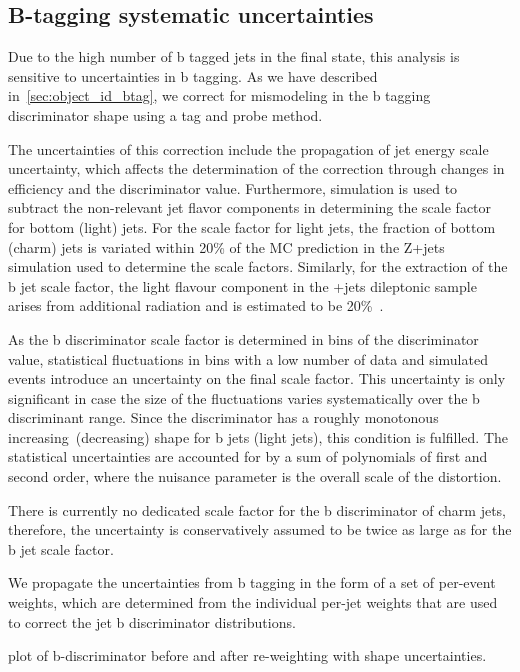 \subsection{B-tagging systematic uncertainties}
\label{sec:btag_unc}
Due to the high number of b tagged jets in the final state, this analysis is sensitive to uncertainties in b tagging. As we have described in~\cref{sec:object_id_btag}, we correct for mismodeling in the b tagging discriminator shape using a tag and probe method.

The uncertainties of this correction include the propagation of jet energy scale uncertainty, which affects the determination of the correction through changes in efficiency and the discriminator value. Furthermore, simulation is used to subtract the non-relevant jet flavor components in determining the scale factor for bottom (light) jets. For the scale factor for light jets, the fraction of bottom (charm) jets is variated within 20\% of the MC prediction in the Z+jets simulation used to determine the scale factors. Similarly, for the extraction of the b jet scale factor, the light flavour component in the \ttbar+jets dileptonic sample arises from additional radiation and is estimated to be 20\%~\cite{CMS-PAS-BTV-15-001}.

As the b discriminator scale factor is determined in bins of the discriminator value, statistical fluctuations in bins with a low number of data and simulated events introduce an uncertainty on the final scale factor. This uncertainty is only significant in case the size of the fluctuations varies systematically over the b discriminant range. Since the discriminator has a roughly monotonous increasing (decreasing) shape for b jets (light jets), this condition is fulfilled. The statistical uncertainties are accounted for by a sum of polynomials of first and second order, where the nuisance parameter is the overall scale of the distortion.

There is currently no dedicated scale factor for the b discriminator of charm jets, therefore, the uncertainty is conservatively assumed to be twice as large as for the b jet scale factor.

We propagate the uncertainties from b tagging in the form of a set of per-event weights, which are determined from the individual per-jet weights that are used to correct the jet b discriminator distributions.

\fixme plot of b-discriminator before and after re-weighting with shape uncertainties.

